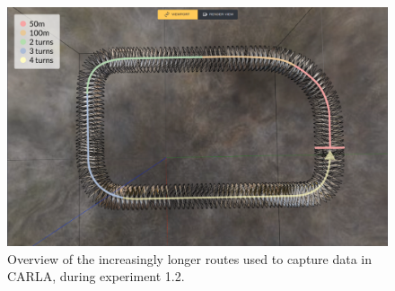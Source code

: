 \begin{figure}[!h]
    \centering
    \includegraphics[width=1.0\textwidth]{figures/capacity-overview.png}
    \caption[Overview of the segments used in Experiment 1.2.]{Overview of the increasingly longer routes used to capture data in CARLA, during experiment 1.2.}
    \label{fig:capacity-overview}
\end{figure}